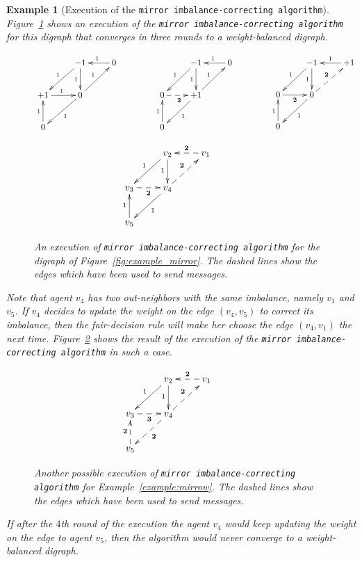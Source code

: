 \documentclass[final]{siamltex}
\newtheorem{example}[theorem]{Example}
\begin{document}
\begin{example}[Execution of the {\texttt{mirror imbalance-correcting
    algorithm}\xspace}]
{    
    Figure~\ref{fig:mod_ex_1} shows an execution of the {\texttt{mirror imbalance-correcting
    algorithm}\xspace} for
    this digraph that converges in three rounds to a weight-balanced
    digraph.
    \begin{figure}[htb]
      \[
      \xymatrix{ & -1 \ar[d]_1 \ar[dl]_1 & 0 \ar[l]_1 & \\
        +1 \ar[r]^1 & 0 \ar[dl]^1 \ar[ur]^1 &\\
        0 \ar[u]^1 & & }\quad 
      \xymatrix{ & -1 \ar[d]_1 \ar[dl]_1 & 0 \ar[l]_1 & \\
        0 \ar@{-->}[r]_{\textbf{2}} & +1 \ar[dl]^1 \ar[ur]^1 &\\
        0 \ar[u]^1 & & }\quad 
      \xymatrix{ & -1 \ar[d]_1 \ar[dl]_1 & +1 \ar[l]_1 & \\
        0 \ar[r]_{\textbf{2}} & 0 \ar[dl]^1 \ar@{-->}[ur]^{\textbf{2}} &\\
        0 \ar[u]^1 & & }       
      \]
      \begin{center}
        \[
        \xymatrix{ & v_2
          \ar[d]_1 \ar[dl]_1 & v_1 \ar@{-->}[l]_{\textbf{2}} & \\
          v_3 \ar@{-->}[r]_{\textbf{2}} & v_4 \ar[dl]^1
          \ar@{-->}[ur]^{\textbf{2}} &\\
          v_5 \ar[u]^1 & & }
        \]
      \end{center}
           \caption{An execution of {\texttt{mirror imbalance-correcting
    algorithm}\xspace} for the digraph of
        Figure~\ref{fig:example_mirror}. The dashed lines show
        the edges which have been used to send messages. }
     \label{fig:mod_ex_1}
   \end{figure}
   Note that agent $ v_4 $ has two out-neighbors with the same
   imbalance, namely $ v_1 $ and $ v_5$.  If $v_4$ decides to update
   the weight on the edge $(v_4,v_5)$ to correct its imbalance, then
   the fair-decision rule will make her choose the edge $(v_4,v_1)$
   the next time.  Figure~\ref{fig:mod_ex_2} shows the result of the
   execution of the {\texttt{mirror imbalance-correcting
    algorithm}\xspace} in such a case.
   \begin{figure}[htb]
     \[
     \xymatrix{ & v_2 \ar[d]_1\ar[dl]_1 & v_1 \ar@{-->}[l]_{\textbf{2}} & \\
       v_3 \ar@{-->}[r]_{\textbf{3}} & v_4 \ar@{-->}[dl]^{\textbf{2}}
       \ar@{-->}[ur]^{\textbf{2}}&\\ 
       v_5 \ar@{-->}[u]^{\textbf{2}} & & }
     \]
     \caption{Another possible execution of {\texttt{mirror imbalance-correcting
    algorithm}\xspace} for
       Example~\ref{example:mirrow}.  The dashed lines show
       the edges which have been used to send messages. }
     \label{fig:mod_ex_2}
   \end{figure}
   If after the $4$th round of the execution the agent $ v_4 $ would
   keep updating the weight on the edge to agent $ v_5 $, then the
   algorithm would never converge to a weight-balanced
   digraph. {\relax\ifmmode\else\unskip\hfill\fi{\hbox{$\bullet$}}} }
\end{example}
\end{document}
